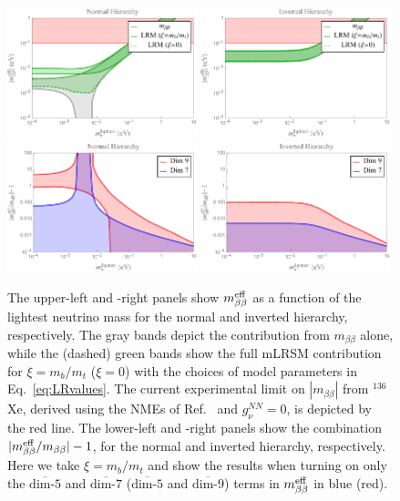 \documentclass[letterpaper,11pt]{article}
\newcommand{\bt}{\beta}
\newcommand{\textoverline}[1]{$\overline{\mbox{#1}}$}
\begin{document}
\begin{figure}[t]
\begin{center}
\includegraphics[width=0.49\textwidth]{mbb_NH_mDelta.pdf}
\includegraphics[width=0.49\textwidth]{mbb_IH_mDelta.pdf}
\includegraphics[width=0.49\textwidth]{Ratio_NH_mDelta.pdf}
\includegraphics[width=0.49\textwidth]{Ratio_IH_mDelta.pdf}
\vspace{-0.75cm}
\end{center}
\caption{
The upper-left and -right panels show $m_{\bt\bt}^{\rm eff}$ as a function of the lightest neutrino mass for the normal and inverted hierarchy, respectively. The gray bands depict the contribution from $m_{\bt\bt}$ alone, while the (dashed) green bands show the full mLRSM contribution for $\xi=m_b/m_t$ ($\xi=0$) with the choices of model parameters in Eq.\ \eqref{eq:LRvalues}. The current experimental limit on $|m_{\bt\bt}|$ from $^{136}$Xe, derived using the NMEs of Ref.\ \cite{Menendez:2017fdf} and $g_\nu^{NN}=0$, is depicted by the red line.
The lower-left and -right panels show the combination $|m_{\bt\bt}^{\rm eff}/m_{\bt\bt}|-1$, for the normal and inverted hierarchy, respectively. Here we take $\xi=m_b/m_t$ and show the results when turning on only the \textoverline{dim-5}  and \textoverline{dim-7}  (\textoverline{dim-5}  and \textoverline{dim-9}) terms in $m_{\bt\bt}^{\rm eff}$ in blue (red).
}\label{LRplot1}
\end{figure}
\end{document}

